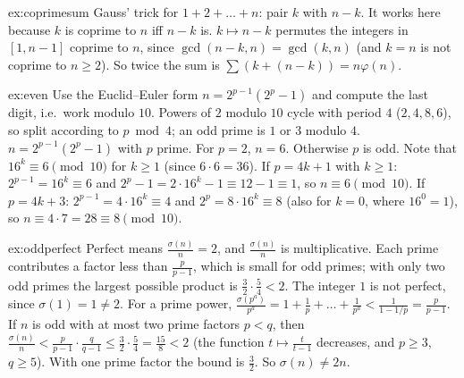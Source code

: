\begin{solution}{ex:coprimesum}
\idea Gauss' trick for $1+2+\dots+n$: pair $k$ with $n-k$. It works here because $k$ is coprime to $n$ iff $n-k$ is.
\writeup $k\mapsto n-k$ permutes the integers in $[1,n-1]$ coprime to $n$, since $\gcd(n-k,n)=\gcd(k,n)$ (and $k=n$ is not coprime to $n\ge2$). So twice the sum is $\sum(k+(n-k))=n\varphi(n)$.
\end{solution}

\begin{solution}{ex:even}
\idea Use the Euclid--Euler form $n=2^{p-1}(2^p-1)$ and compute the last digit, i.e.\ work modulo $10$. Powers of $2$ modulo $10$ cycle with period $4$ ($2,4,8,6$), so split according to $p\bmod4$; an odd prime is $1$ or $3$ modulo $4$.
\writeup $n=2^{p-1}(2^p-1)$ with $p$ prime. For $p=2$, $n=6$. Otherwise $p$ is odd. Note that $16^k\equiv6\pmod{10}$ for $k\ge1$ (since $6\cdot6=36$).
If $p=4k+1$ with $k\ge1$: $2^{p-1}=16^k\equiv6$ and $2^p-1=2\cdot16^k-1\equiv12-1\equiv1$, so $n\equiv6\pmod{10}$.
If $p=4k+3$: $2^{p-1}=4\cdot16^k\equiv4$ and $2^p=8\cdot16^k\equiv8$ (also for $k=0$, where $16^0=1$), so $n\equiv4\cdot7=28\equiv8\pmod{10}$.
\end{solution}

\begin{solution}{ex:oddperfect}
\idea Perfect means $\frac{\sigma(n)}n=2$, and $\frac{\sigma(n)}n$ is multiplicative. Each prime contributes a factor less than $\frac p{p-1}$, which is small for odd primes; with only two odd primes the largest possible product is $\frac32\cdot\frac54<2$.
\writeup The integer $1$ is not perfect, since $\sigma(1)=1\ne2$. For a prime power, $\frac{\sigma(p^a)}{p^a}=1+\frac1p+\dots+\frac1{p^a}<\frac1{1-1/p}=\frac p{p-1}$. If $n$ is odd with at most two prime factors $p<q$, then $\frac{\sigma(n)}n<\frac p{p-1}\cdot\frac q{q-1}\le\frac32\cdot\frac54=\frac{15}8<2$ (the function $t\mapsto\frac t{t-1}$ decreases, and $p\ge3$, $q\ge5$). With one prime factor the bound is $\frac32$. So $\sigma(n)\ne2n$.
\end{solution}

